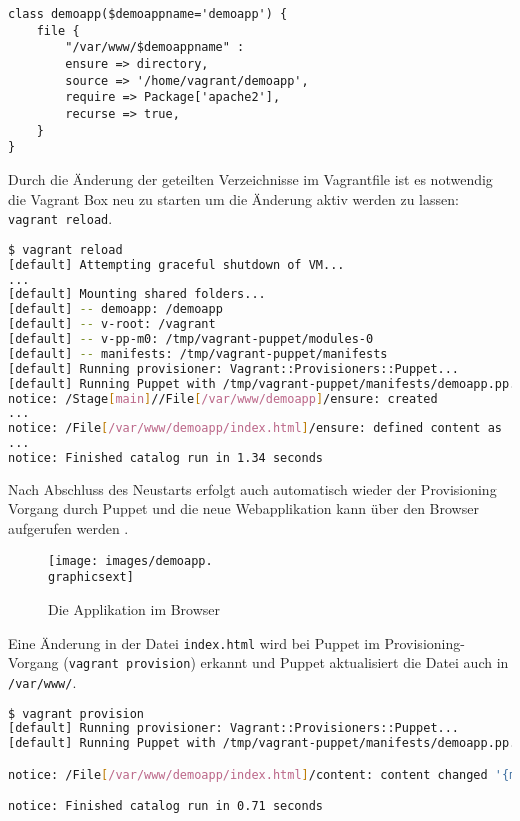\documentclass[12pt,a4paper,ngerman]{article}
\begin{document}
\begin{lstlisting}[language=puppet,caption=Puppet Module demoapp,label=puppet-demo-module]
class demoapp($demoappname='demoapp') {
    file {
        "/var/www/$demoappname" :
        ensure => directory,
        source => '/home/vagrant/demoapp',
        require => Package['apache2'],
        recurse => true,
    }
}
\end{lstlisting}


Durch die Änderung der geteilten Verzeichnisse im Vagrantfile ist es notwendig die Vagrant Box neu zu starten um die Änderung aktiv werden zu lassen:  \lstinline$vagrant reload$.
\begin{lstlisting}[language=sh,caption=Puppet reload mit Provisioning der Applikation, label=reloaddemoapp]
$ vagrant reload
[default] Attempting graceful shutdown of VM...
...
[default] Mounting shared folders...
[default] -- demoapp: /demoapp
[default] -- v-root: /vagrant
[default] -- v-pp-m0: /tmp/vagrant-puppet/modules-0
[default] -- manifests: /tmp/vagrant-puppet/manifests
[default] Running provisioner: Vagrant::Provisioners::Puppet...
[default] Running Puppet with /tmp/vagrant-puppet/manifests/demoapp.pp...
notice: /Stage[main]//File[/var/www/demoapp]/ensure: created
...
notice: /File[/var/www/demoapp/index.html]/ensure: defined content as '{md5}90a8d419b9c7b43b09ba73abebaf8f4c'
...
notice: Finished catalog run in 1.34 seconds
\end{lstlisting}

Nach Abschluss des Neustarts erfolgt auch automatisch wieder der Provisioning Vorgang durch Puppet und die neue Webapplikation kann über den Browser aufgerufen werden .
\begin{figure}
  \begin{center}
    \texttt{[image: images/demoapp.\\graphicsext]}
  \end{center}
  \caption{Die Applikation im Browser}
  \label{demoapp}
\end{figure}

Eine Änderung in der Datei \lstinline$index.html$ wird bei Puppet im Provisioning-Vorgang (\lstinline$vagrant provision$) erkannt und Puppet aktualisiert die Datei auch in \lstinline$/var/www/$.
\begin{lstlisting}[language=sh,caption=Puppet Provisioning nach Änderung von index.html, label=provisionapp]
$ vagrant provision
[default] Running provisioner: Vagrant::Provisioners::Puppet...
[default] Running Puppet with /tmp/vagrant-puppet/manifests/demoapp.pp...

notice: /File[/var/www/demoapp/index.html]/content: content changed '{md5}90a8d419b9c7b43b09ba73abebaf8f4c' to '{md5}0a4ee5bb63c3e5c29cc54cf36a4be23c'

notice: Finished catalog run in 0.71 seconds
\end{lstlisting}
\end{document}
